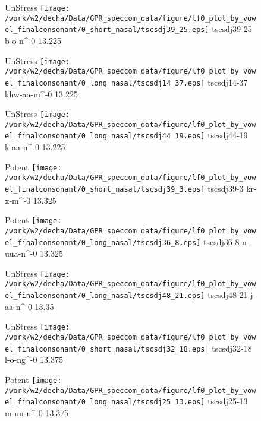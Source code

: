 \documentclass{article}
\begin{document}
\begin{figure}[t]
\begin{minipage}[b]{.24\textwidth}
UnStress
\centering
\texttt{[image: /work/w2/decha/Data/GPR\_speccom\_data/figure/lf0\_plot\_by\_vowel\_finalconsonant/0\_short\_nasal/tscsdj39\_25.eps]}
tscsdj39-25 b-o-n\textasciicircum-0 13.225
\end{minipage}
\begin{minipage}[b]{.24\textwidth}
UnStress
\centering
\texttt{[image: /work/w2/decha/Data/GPR\_speccom\_data/figure/lf0\_plot\_by\_vowel\_finalconsonant/0\_long\_nasal/tscsdj14\_37.eps]}
tscsdj14-37 khw-aa-m\textasciicircum-0 13.225
\end{minipage}
\begin{minipage}[b]{.24\textwidth}
UnStress
\centering
\texttt{[image: /work/w2/decha/Data/GPR\_speccom\_data/figure/lf0\_plot\_by\_vowel\_finalconsonant/0\_long\_nasal/tscsdj44\_19.eps]}
tscsdj44-19 k-aa-n\textasciicircum-0 13.225
\end{minipage}
\begin{minipage}[b]{.24\textwidth}
\colorbox{Apricot}{Potent}
\centering
\texttt{[image: /work/w2/decha/Data/GPR\_speccom\_data/figure/lf0\_plot\_by\_vowel\_finalconsonant/0\_short\_nasal/tscsdj39\_3.eps]}
tscsdj39-3 kr-x-m\textasciicircum-0 13.325
\end{minipage}
\end{figure}
\clearpage
\begin{figure}[t]
\begin{minipage}[b]{.24\textwidth}
\colorbox{Apricot}{Potent}
\centering
\texttt{[image: /work/w2/decha/Data/GPR\_speccom\_data/figure/lf0\_plot\_by\_vowel\_finalconsonant/0\_long\_nasal/tscsdj36\_8.eps]}
tscsdj36-8 n-uua-n\textasciicircum-0 13.325
\end{minipage}
\begin{minipage}[b]{.24\textwidth}
UnStress
\centering
\texttt{[image: /work/w2/decha/Data/GPR\_speccom\_data/figure/lf0\_plot\_by\_vowel\_finalconsonant/0\_long\_nasal/tscsdj48\_21.eps]}
tscsdj48-21 j-aa-n\textasciicircum-0 13.35
\end{minipage}
\begin{minipage}[b]{.24\textwidth}
UnStress
\centering
\texttt{[image: /work/w2/decha/Data/GPR\_speccom\_data/figure/lf0\_plot\_by\_vowel\_finalconsonant/0\_short\_nasal/tscsdj32\_18.eps]}
tscsdj32-18 l-o-ng\textasciicircum-0 13.375
\end{minipage}
\begin{minipage}[b]{.24\textwidth}
\colorbox{Apricot}{Potent}
\centering
\texttt{[image: /work/w2/decha/Data/GPR\_speccom\_data/figure/lf0\_plot\_by\_vowel\_finalconsonant/0\_long\_nasal/tscsdj25\_13.eps]}
tscsdj25-13 m-uu-n\textasciicircum-0 13.375
\end{minipage}
\end{figure}
\end{document}
